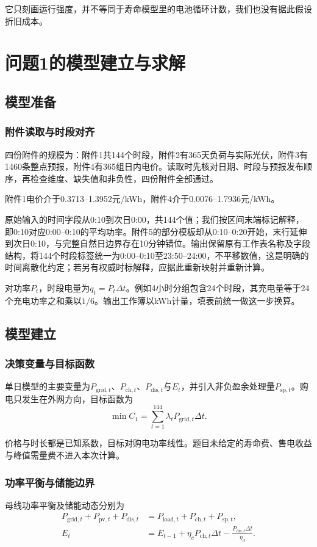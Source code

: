 \documentclass[UTF8,fontset=none,a4paper,zihao=-4]{ctexart}
\newcommand{\dd}{\Delta t}
\begin{document}
它只刻画运行强度，并不等同于寿命模型里的电池循环计数，我们也没有据此假设折旧成本。

\section{问题1的模型建立与求解}
\subsection{模型准备}
\subsubsection{附件读取与时段对齐}
四份附件的规模为：附件1共144个时段，附件2有365天负荷与实际光伏，附件3有1460条整点预报，附件4有365组日内电价。读取时先核对日期、时段与预报发布顺序，再检查维度、缺失值和非负性，四份附件全部通过。

附件1电价介于0.3713--1.3952元/kWh，附件4介于0.0076--1.7936元/kWh。

原始输入的时间字段从0:10到次日0:00，共144个值；我们按区间末端标记解释，即0:10对应0:00--0:10的平均功率。附件5的部分模板却从0:10--0:20开始，末行延伸到次日0:10，与完整自然日边界存在10分钟错位。输出保留原有工作表名称及字段结构，将144个时段标签统一为0:00--0:10至23:50--24:00，不平移数值，这是明确的时间离散化约定；若另有权威时标解释，应据此重新映射并重新计算。

对功率\(P_t\)，时段电量为\(q_t=P_t\dd\)。例如4小时分组包含24个时段，其充电量等于24个充电功率之和乘以\(1/6\)。输出工作簿以kWh计量，填表前统一做这一步换算。

\subsection{模型建立}
\subsubsection{决策变量与目标函数}
单日模型的主要变量为\(P_{\mathrm{grid},t}\)、\(P_{\mathrm{ch},t}\)、\(P_{\mathrm{dis},t}\)与\(E_t\)，并引入非负盈余处理量\(P_{\mathrm{sp},t}\)。购电只发生在外网方向，目标函数为
\begin{equation}\label{eq:q1obj}
\min C_1=\sum_{t=1}^{144}\lambda_t P_{\mathrm{grid},t}\dd.
\end{equation}

价格与时长都是已知系数，目标对购电功率线性。题目未给定的寿命费、售电收益与峰值需量费不进入本次计算。

\subsubsection{功率平衡与储能边界}
母线功率平衡及储能动态分别为
\begin{align}
P_{\mathrm{grid},t}+P_{\mathrm{pv},t}+P_{\mathrm{dis},t}
&=P_{\mathrm{load},t}+P_{\mathrm{ch},t}+P_{\mathrm{sp},t},\label{eq:balance}\\
E_t&=E_{t-1}+\eta_cP_{\mathrm{ch},t}\dd-\frac{P_{\mathrm{dis},t}\dd}{\eta_d}.\label{eq:soc}
\end{align}
\end{document}
